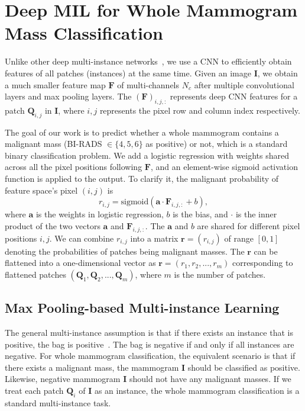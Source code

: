 \documentclass[runningheads,a4paper]{llncs}
\begin{document}
\section{Deep MIL for Whole Mammogram Mass Classification}\label{sec:dmlmamm}
Unlike other deep multi-instance networks~\cite{yan2016multi,hou2015patch}, we use a CNN to efficiently obtain features of all patches (instances) at the same time. Given an image $\bm{I}$, we obtain a much smaller feature map $\bm{F}$ of multi-channels $N_c$ after multiple convolutional layers and max pooling layers. The $(\bm{F})_{i,j,:}$ represents deep CNN features for a patch $\bm{Q}_{i,j}$ in $\bm{I}$, where $i,j$ represents the pixel row and column index respectively.%

The goal of our work is to predict whether a whole mammogram contains a malignant mass (BI-RADS $\in \{4, 5, 6\}$ as positive) or not, which is a standard binary classification problem. We add a logistic regression with weights shared across all the pixel positions following $\bm{F}$, and an element-wise sigmoid activation function is applied to the output. To clarify it, the malignant probability of feature space's pixel $(i,j)$ is
\begin{equation}
\label{equ:cnn}
r_{i,j} = \text{sigmoid}(\bm{a} \cdot \bm{F}_{i,j,:} + b),
\end{equation}
where $\bm{a}$ is the weights in logistic regression, $b$ is the bias, and $\cdot$ is the inner product of the two vectors $\bm{a}$ and $\bm{F}_{i,j,:}$. The $\bm{a}$ and $b$ are shared for different pixel positions $i,j$. We can combine $r_{i,j}$ into a matrix $\bm{r} = (r_{i,j})$ of range $[0, 1]$ denoting the probabilities of patches being malignant masses. The $\bm{r}$ can be flattened into a one-dimensional vector as $\bm{r} = (r_{1}, r_{2}, ..., r_{m})$ corresponding to flattened patches $(\bm{Q}_{1}, \bm{Q}_{2}, ..., \bm{Q}_{m})$, where $m$ is the number of patches.
\subsection{Max Pooling-based Multi-instance Learning}\label{sec:maxpool}
The general multi-instance assumption is that if there exists an instance that is positive, the bag is positive~\cite{dietterich1997solving}. The bag is negative if and only if all instances are negative. For whole mammogram classification, the equivalent scenario is that if there exists a malignant mass, the mammogram $\bm{I}$ should be classified as positive. Likewise, negative mammogram $\bm{I}$ should not have any malignant masses. If we treat each patch $\bm{Q}_{i}$ of $\bm{I}$ as an instance, the whole mammogram classification is a standard multi-instance task.
\end{document}
